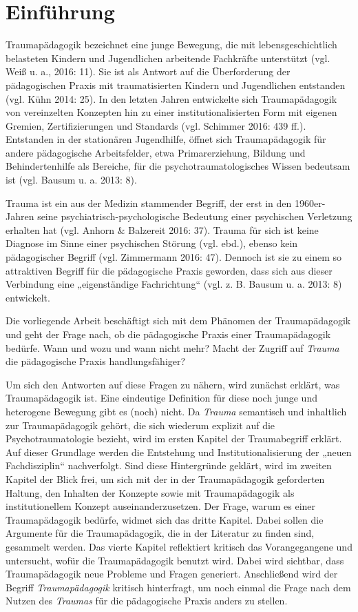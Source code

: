 \section{Einführung}

Traumapädagogik bezeichnet eine junge Bewegung, die mit lebensgeschichtlich belasteten Kindern und Jugendlichen arbeitende Fachkräfte unterstützt (vgl. Weiß u. a., 2016: 11). Sie ist als Antwort auf die Überforderung der pädagogischen Praxis mit traumatisierten Kindern und Jugendlichen entstanden (vgl. Kühn 2014: 25). In den letzten Jahren entwickelte sich Traumapädagogik von vereinzelten Konzepten hin zu einer institutionalisierten Form mit eigenen Gremien, Zertifizierungen und Standards (vgl. Schimmer 2016: 439 ff.). Entstanden in der stationären Jugendhilfe, öffnet sich Traumapädagogik für andere pädagogische Arbeitsfelder, etwa Primarerziehung, Bildung und Behindertenhilfe als Bereiche, für die psychotraumatologisches Wissen bedeutsam ist (vgl. Bausum u. a. 2013: 8).

Trauma ist ein aus der Medizin stammender Begriff, der erst in den 1960er-Jahren seine psychiatrisch-psychologische Bedeutung einer psychischen Verletzung erhalten hat (vgl. Anhorn \& Balzereit 2016: 37). Trauma für sich ist keine Diagnose im Sinne einer psychischen Störung (vgl. ebd.), ebenso kein pädagogischer Begriff (vgl. Zimmermann 2016: 47). Dennoch ist sie zu einem so attraktiven Begriff für die pädagogische Praxis geworden, dass sich aus dieser Verbindung eine „eigenständige Fachrichtung“ (vgl. z. B. Bausum u. a. 2013: 8) entwickelt.

Die vorliegende Arbeit beschäftigt sich mit dem Phänomen der Traumapädagogik und geht der Frage nach, ob die pädagogische Praxis einer Traumapädagogik bedürfe. Wann und wozu und wann nicht mehr? Macht der Zugriff auf \textit{Trauma} die pädagogische Praxis handlungsfähiger?

Um sich den Antworten auf diese Fragen zu nähern, wird zunächst erklärt, was Traumapädagogik ist. Eine eindeutige Definition für diese noch junge und heterogene Bewegung gibt es (noch) nicht. Da \textit{Trauma} semantisch und inhaltlich zur Traumapädagogik gehört, die sich wiederum explizit auf die Psychotraumatologie bezieht, wird im ersten Kapitel der Traumabegriff erklärt. Auf dieser Grundlage werden die Entstehung und Institutionalisierung der „neuen Fachdisziplin“ nachverfolgt. Sind diese Hintergründe geklärt, wird im zweiten Kapitel der Blick frei, um sich mit der in der Traumapädagogik geforderten Haltung, den Inhalten der Konzepte sowie mit Traumapädagogik als institutionellem Konzept auseinanderzusetzen. Der Frage, warum es einer Traumapädagogik bedürfe, widmet sich das dritte Kapitel. Dabei sollen die Argumente für die Traumapädagogik, die in der Literatur zu finden sind, gesammelt werden. Das vierte Kapitel reflektiert kritisch das Vorangegangene und untersucht, wofür die Traumapädagogik benutzt wird. Dabei wird sichtbar, dass Traumapädagogik neue Probleme und Fragen generiert. Anschließend wird der Begriff \textit{Traumapädagogik} kritisch hinterfragt, um noch einmal die Frage nach dem Nutzen des \textit{Traumas} für die pädagogische Praxis anders zu stellen.
